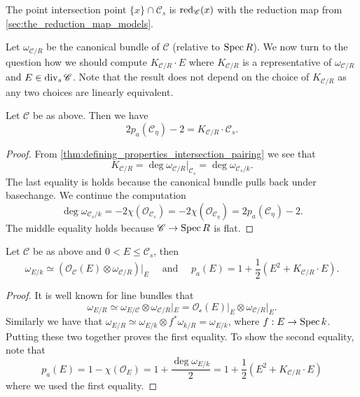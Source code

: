 \begin{remark}
	The point intersection point $\{x\}  \cap \mathscr C_s$ is $\operatorname{red}_{\mathscr C}(x)$ with the reduction map from \cref{sec:the_reduction_map_models}. 
\end{remark}

Let $\omega_{\mathscr C / R} $ be the canonical bundle of $\mathscr C$ (relative to $\operatorname{Spec} R$).
We now turn to the question how we should compute $K_{\mathscr C / R} \cdot E$ where  $K_{\mathscr C / R}$ is a representative of $\omega_{\mathscr C / R}$ and $E \in \operatorname{div}_s \mathscr C$. 
Note that the result does not depend on the choice of $K_{\mathscr C / R}$ as any two choices are linearly equivalent. 

\begin{proposition}\label{prop:intersection_canonical_special}
	Let $\mathscr C$ be as above. 
	Then we have \[
		2p_a(\mathscr C_\eta) - 2 = K_{\mathscr C / R} \cdot \mathscr C_s  
	.\] 
\end{proposition}
\begin{proof}
	From \cref{thm:defining_properties_intersection_pairing} we see that \[
		K_{\mathscr C / R} = \deg \omega_{\mathscr C / R}|_{\mathscr C_s} = \deg \omega _{\mathscr C_s / k}
	.\] 
	The last equality is holds because the canonical bundle pulls back under basechange. 
	We continue the computation \[
		\deg \omega_{\mathscr C_s / k} = - 2\chi (\mathcal{O}_{\mathscr C_s}) = -2 \chi (\mathcal{O}_{\mathscr C_\eta}) = 2p_a(\mathscr C_\eta) - 2
	.\] 
	The middle equality holds because $\mathscr C \to \operatorname{Spec} R$ is flat. 
\end{proof}

\begin{theorem}\label{thm:adjunction_formula}
	Let $\mathscr C$ be as above and $0 < E \le \mathscr C_s$, then \[
		\omega_{E / k} \simeq (\mathcal{O}_{\mathscr C}(E) \otimes \omega_{\mathscr C / R})|_E \quad \text{ and } \quad p_a(E) = 1 + \frac{1}{2}(E^2 + K_{\mathscr C / R}\cdot E)
	.\] 
\end{theorem}
\begin{proof}
	It is well known for line bundles that \[
		\omega_{E / R} \simeq \omega_{E / \mathscr C} \otimes \omega_{\mathscr C / R}|_{E} = \mathcal{O}_{\mathscr c}(E)|_E \otimes \omega_{\mathscr C / R}|_E
	.\]
	Similarly we have that $\omega_{E / R} \simeq \omega_{E / k} \otimes  f^*\omega_{k / R}= \omega_{E / k}$, where $f: E \to \operatorname{Spec} k$. 
	Putting these two together proves the first equality.
	To show the second equality, note that \[
		p_a(E) = 1 - \chi(\mathcal{O}_E) = 1  + \frac{\deg \omega_{E / k}}{2} = 1 + \frac{1}{2}\left(E^2 + K_{\mathscr C / R} \cdot E\right)
	\] 
	where we used the first equality. 
\end{proof}

